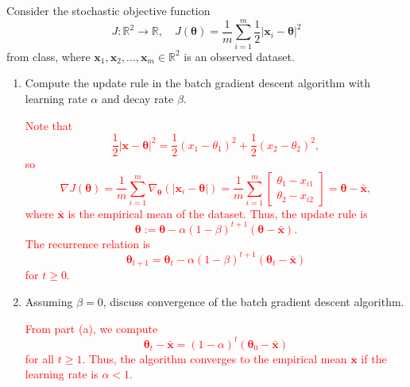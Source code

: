 \documentclass[12pt,reqno]{amsart}
\begin{document}
\prob Consider the stochastic objective function
	\[J:\mathbb{R}^2 \to \mathbb{R}, \quad J(\boldsymbol{\theta}) = \frac{1}{m} \sum_{i=1}^m \frac{1}{2}|\mathbf{x}_i - \boldsymbol{\theta}|^2
	\]
from class, where $\mathbf{x}_1,\mathbf{x}_2, \ldots, \mathbf{x}_m \in \mathbb{R}^2$ is an observed dataset.

\medskip
\begin{enumerate}
\item Compute the update rule in the batch gradient descent algorithm with learning rate $\alpha$ and decay rate $\beta$.

\bigskip
\textcolor{red}{Note that
	\[\frac{1}{2}|\mathbf{x} - \boldsymbol{\theta}|^2 = \frac{1}{2}(x_1 - \theta_1)^2 + \frac{1}{2}(x_2 - \theta_2)^2,
	\]
so
	\[\nabla J(\boldsymbol{\theta}) = \frac{1}{m} \sum_{i=1}^m \nabla_{\boldsymbol{\theta}} \left( |\mathbf{x}_i - \boldsymbol{\theta}|\right) = \frac{1}{m} \sum_{i=1}^m \begin{bmatrix}
	\theta_1- x_{i1} \\
	\theta_2 - x_{i2}
	\end{bmatrix} = \boldsymbol{\theta} - \bar{\mathbf{x}},
	\]
where $\bar{\mathbf{x}}$ is the empirical mean of the dataset. Thus, the update rule is
	\[\boldsymbol{\theta} := \boldsymbol{\theta} - \alpha(1 - \beta)^{t+1} (\boldsymbol{\theta} - \bar{\mathbf{x}}).
	\]
The recurrence relation is
	\[\boldsymbol{\theta}_{t+1} = \boldsymbol{\theta}_t - \alpha(1 - \beta)^{t+1} (\boldsymbol{\theta}_t - \bar{\mathbf{x}})
	\]
for $t\geq 0$.}
\bigskip

\item Assuming $\beta=0$, discuss convergence of the batch gradient descent algorithm.

\bigskip
\textcolor{red}{From part (a), we compute
	\[\boldsymbol{\theta}_t - \bar{\mathbf{x}} = (1-\alpha)^t(\boldsymbol{\theta}_0 - \bar{\mathbf{x}})
	\]
for all $t\geq 1$. Thus, the algorithm converges to the empirical mean $\mathbf{x}$ if the learning rate is $\alpha<1$.}
\bigskip
\end{enumerate}
\end{document}
